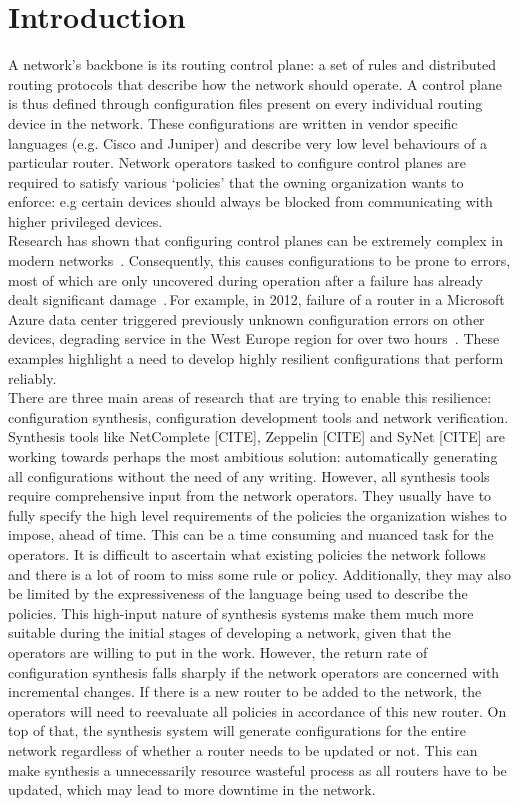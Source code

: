 \section{Introduction}

A network's backbone is its routing control plane: a set of rules and distributed routing protocols that describe how the network should operate. A control plane is thus defined through configuration files present on every individual routing device in the network. These configurations are written in vendor specific languages (e.g. Cisco and Juniper) and describe very low level behaviours of a particular router. Network operators tasked to configure control planes are required to satisfy various `policies' that the owning organization wants to enforce: e.g certain devices should always be blocked from communicating with higher privileged devices.\\

Research has shown that configuring control planes can be extremely complex in modern networks~\cite{complexity}. Consequently, this causes configurations to be prone to errors, most of which are only uncovered during operation after a failure has already dealt significant damage~\cite{errors}. For example, in 2012, failure of a router in a Microsoft Azure data center triggered previously unknown configuration errors on other devices, degrading service in the West Europe region for over two hours~\cite{azure}. These examples highlight a need to develop highly resilient configurations that perform reliably.\\  

There are three main areas of research that are trying to enable this resilience: configuration synthesis, configuration development tools and network verification. Synthesis tools like NetComplete [CITE], Zeppelin [CITE] and SyNet [CITE] are working towards perhaps the most ambitious solution: automatically generating all configurations without the need of any writing. However, all synthesis tools require comprehensive input from the network operators. They usually have to fully specify the high level requirements of the policies the organization wishes to impose, ahead of time. This can be a time consuming and nuanced task for the operators. It is difficult to ascertain what existing policies the network follows and there is a lot of room to miss some rule or policy. Additionally, they may also be limited by the expressiveness of the language being used to describe the policies. This high-input nature of synthesis systems make them much more suitable during the initial stages of developing a network, given that the operators are willing to put in the work. However, the return rate of configuration synthesis falls sharply if the network operators are concerned with incremental changes. If there is a new router to be added to the network, the operators will need to reevaluate all policies in accordance of this new router. On top of that, the synthesis system will generate configurations for the entire network regardless of whether a router needs to be updated or not. This can make synthesis a unnecessarily resource wasteful process as all routers have to be updated, which may lead to more downtime in the network.\\ 

